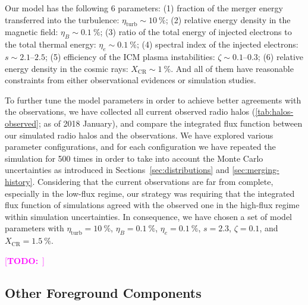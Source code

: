 \documentclass[modern]{aastex62}
\newcommand{\R}[1]{\mathrm{#1}}
\newcommand{\TODO}[1]{\textcolor{magenta}{[\textbf{TODO:}~\uuline{#1}]}}
\begin{document}
Our model has the following 6 parameters:
(1) fraction of the merger energy transferred into the turbulence:
$\eta_{\R{turb}} \sim \SI{10}{\percent}$;
(2) relative energy density in the magnetic field:
$\eta_B \sim \SI{0.1}{\percent}$;
(3) ratio of the total energy of injected electrons to the total thermal
energy: $\eta_e \sim \SI{0.1}{\percent}$;
(4) spectral index of the injected electrons: $s \sim \numrange{2.1}{2.5}$;
(5) efficiency of the ICM plasma instabilities:
$\zeta \sim \numrange{0.1}{0.3}$;
(6) relative energy density in the cosmic rays:
$X_{\R{CR}} \sim \SI{1}{\percent}$.
And all of them have reasonable constraints from either observational
evidences or simulation studies.

To further tune the model parameters in order to achieve better agreements
with the observations, we have collected all current observed radio halos
(\autoref{tab:halos-observed}; as of 2018 January), and compare the integrated
flux function between our simulated radio halos and the observations.
We have explored various parameter configurations,
and for each configuration we have repeated the simulation for 500 times
in order to take into account the Monte Carlo uncertainties as introduced in
Sections~\ref{sec:distributions} and \ref{sec:merging-history}.
Considering that the current observations are far from complete,
especially in the low-flux regime, our strategy was requiring that the
integrated flux function of simulations agreed with the observed one
in the high-flux regime within simulation uncertainties.
In consequence, we have chosen a set of model parameters with
$\eta_{\R{turb}} = \SI{10}{\percent}$, $\eta_B = \SI{0.1}{\percent}$,
$\eta_e = \SI{0.1}{\percent}$, $s = 2.3$,
$\zeta = 0.1$, and $X_{\R{CR}} = \SI{1.5}{\percent}$.

\TODO{figures ...}

\subsection{Other Foreground Components}
\label{sec:fg-other}
\end{document}
